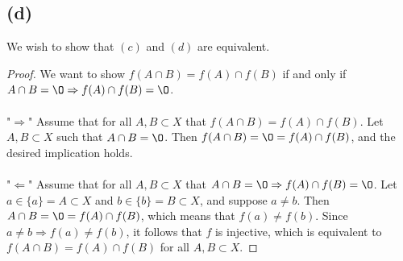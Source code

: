 \documentclass{article}
\begin{document}
\subsection*{(d)}
We wish to show that $(c)$ and $(d)$ are equivalent.
\begin{proof}
    We want to show $f(A \cap B) = f(A) \cap f(B)$ if and only if $A \cap B = \O \Rightarrow f(A) \cap f(B) = \O$.
    \\\\
    "$\Rightarrow$" Assume that for all $A,B \subset X$ that $f(A \cap B) = f(A) \cap f(B)$.
    Let $A,B \subset X$ such that $A \cap B = \O$.
    Then $f(A \cap B) = \O = f(A) \cap f(B)$, and the desired implication holds.
    \\\\
    "$\Leftarrow$" Assume that for all $A,B\subset X$ that $A \cap B = \O \Rightarrow f(A) \cap f(B) = \O$.
    Let $a \in \{a\} = A \subset X$ and $b \in \{b\} = B \subset X$, and suppose $a \neq b$.
    Then $A \cap B = \O = f(A) \cap f(B)$, which means that $f(a) \neq f(b)$.
    Since $a \neq b \Rightarrow f(a) \neq f(b)$, it follows that $f$ is injective, which is equivalent to $f(A \cap B) = f(A) \cap f(B)$ for all $A,B \subset X$.
\end{proof}
\end{document}

